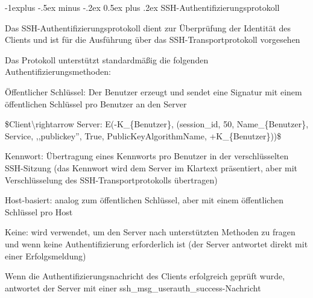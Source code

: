\documentclass[a4paper]{article}
\makeatletter
\renewcommand{\subsection}{\@startsection{subsection}{2}{0mm}%
 {-1explus -.5ex minus -.2ex}%
 {0.5ex plus .2ex}%
 {\normalfont\normalsize\bfseries}}
\makeatother
\begin{document}
\begin{multicols}{3}
\begin{itemize*}
            \subsection{SSH-Authentifizierungsprotokoll}
            \begin{itemize*}
                  \item       Das SSH-Authentifizierungsprotokoll dient zur Überprüfung der
                  Identität des Clients und ist für die Ausführung über das
                  SSH-Transportprotokoll vorgesehen
                  \item       Das Protokoll unterstützt standardmäßig die folgenden
                  Authentifizierungsmethoden:
                  \begin{itemize*}
                        \item Öffentlicher Schlüssel: Der Benutzer erzeugt und sendet eine Signatur mit einem öffentlichen Schlüssel pro Benutzer an den Server
                        \item \$Client\textbackslash rightarrow Server: E(-K\_\{Benutzer\}, (session\_id, 50, Name\_\{Benutzer\}, Service, ,,publickey'', True, PublicKeyAlgorithmName, +K\_\{Benutzer\}))\$
                        \item Kennwort: Übertragung eines Kennworts pro Benutzer in der verschlüsselten SSH-Sitzung (das Kennwort wird dem Server im Klartext präsentiert, aber mit Verschlüsselung des SSH-Transportprotokolls übertragen)
                        \item Host-basiert: analog zum öffentlichen Schlüssel, aber mit einem öffentlichen Schlüssel pro Host
                        \item Keine: wird verwendet, um den Server nach unterstützten Methoden zu fragen und wenn keine Authentifizierung erforderlich ist (der Server antwortet direkt mit einer Erfolgsmeldung)
                  \end{itemize*}
                  \item       Wenn die Authentifizierungsnachricht des Clients erfolgreich geprüft
                  wurde, antwortet der Server mit einer
                  ssh\_msg\_userauth\_success-Nachricht
            \end{itemize*}


\end{itemize*}
\end{multicols}
\end{document}
